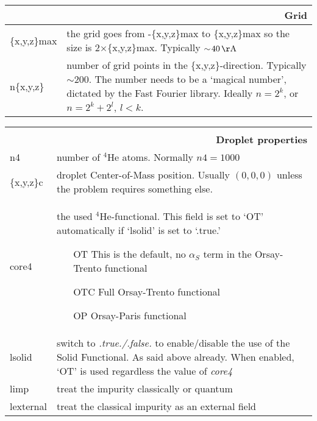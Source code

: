 \documentclass[10pt,a4paper]{article}
\begin{document}
\begin{center}
		\begin{tabular}{l|p{9.6cm}}
			\multicolumn{2}{r}{\textbf{Grid}}	\\
			\hline\hline
			\{x,y,z\}max	&	the grid goes from -\{x,y,z\}max to \{x,y,z\}max so the size is 2$\times$\{{x,y,z}\}max. Typically $\sim\!40\,\mathrm{\AA}$ \\
			\hline
			n\{x,y,z\}		&	number of grid points in the \{x,y,z\}-direction. Typically $\sim\!200$. The number needs to be a `magical number', dictated by the Fast Fourier library. Ideally $n=2^k$, or $n=2^k+2^l$, $l<k$.
		\end{tabular}
		
		\begin{tabular}{l|p{9.6cm}}
			\multicolumn{2}{r}{\textbf{}}	\\
			\multicolumn{2}{r}{\textbf{Droplet properties}}	\\
			\hline\hline
			n4				&	number of $^4$He atoms. Normally $n4=1000$	\\
			\hline
			\{x,y,z\}c		&	droplet Center-of-Mass position. Usually $(0,0,0)$ unless the problem requires something else.	\\
			\hline
			core4		& the used $^4$He-functional. This field is set to `OT' automatically if `lsolid' is set to `.true.'
			\vspace{5px}
			\begin{enumerate}
				\item[OT] This is the default, no $\alpha_S$ term in the Orsay-Trento functional\footnotemark[1]
				\item[OTC] Full Orsay-Trento functional\footnotemark[1]
				\item[OP] Orsay-Paris functional\footnotemark[2]
			\end{enumerate}		\\
			\hline
			lsolid		& switch to \emph{.true./.false.} to enable/disable the use of the Solid Functional\footnotemark[3]. As said above already. When enabled, `OT' is used regardless the value of \emph{core4} \\
			\hline
			limp		& treat the impurity classically or quantum\\
			\hline
			lexternal	& treat the classical impurity as an external field
		\end{tabular}
		
		

\end{center}
\end{document}
